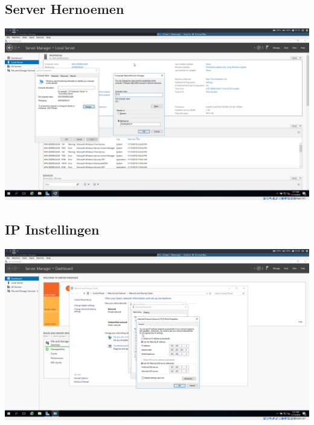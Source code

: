 \documentclass[a4paper]{article}
\begin{document}
\subsection{Server Hernoemen}
\begin{center}
	\includegraphics[width=15cm]{Pictures/DC1/Basisconfiguratie/1542295124.png}
\end{center}
\subsection{IP Instellingen}
\begin{center}
	\includegraphics[width=15cm]{Pictures/DC1/Basisconfiguratie/1542295346.png}
\end{center}
\end{document}
